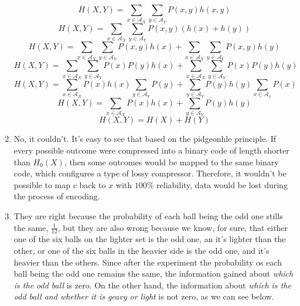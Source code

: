 \documentclass{article}
\begin{document}
\begin{enumerate}
	      \[H(X, Y) = \sum_{x \in \mathcal{A}_X} \sum_{y \in \mathcal{A}_Y} P(x, y)h(x, y)\]
	      \[H(X, Y) = \sum_{x \in \mathcal{A}_X} \sum_{y \in \mathcal{A}_Y} P(x, y)(h(x) + h(y))\]
	      \[H(X, Y) = \sum_{x \in \mathcal{A}_X} \sum_{y \in \mathcal{A}_Y} P(x, y)h(x) + \sum_{x \in \mathcal{A}_X} \sum_{y \in \mathcal{A}_Y} P(x, y)h(y)\]
	      \[H(X, Y) = \sum_{x \in \mathcal{A}_X} \sum_{y \in \mathcal{A}_Y} P(x)P(y)h(x) + \sum_{x \in \mathcal{A}_X} \sum_{y \in \mathcal{A}_Y} P(x)P(y)h(y)\]
	      \[H(X, Y) = \sum_{x \in \mathcal{A}_X} P(x)h(x) \sum_{y \in \mathcal{A}_Y} P(y) + \sum_{y \in \mathcal{A}_Y} P(y)h(y) \sum_{x \in \mathcal{A}_x} P(x)\]
	      \[H(X, Y) = \sum_{x \in \mathcal{A}_X} P(x)h(x) + \sum_{y \in \mathcal{A}_Y} P(y)h(y) \]
	      \[H(X, Y) = H(X) + H(Y)\]

	\item No, it couldn't. It's easy to see that based on the pidgeonhle principle. If every possible outcome were compressed into a binary code of length shorter than \(H_0(X)\), then some outcomes would be mapped to the same binary code, which configures a type of lossy compressor. Therefore, it wouldn't be possible to map \(c\) back to \(x\) with \(100\%\) reliability, data would be lost during the process of encoding.

	\item They are right because the probability of each ball being the odd one stills the same, \(\frac{1}{12}\), but they are also wrong because we know, for sure, that either one of the six balls on the lighter set is the odd one, an it's lighter than the other, or one of the six balls in the heavier side is the odd one, and it's heavier than the others.
	      Since after the experiment the probability os each ball being the odd one remains the same, the information gained about \textit{which is the odd ball} is zero. On the other hand, the information about \textit{which is the odd ball and whether it is geavy or light} is not zero, as we can see below.


\end{enumerate}


\end{document}
